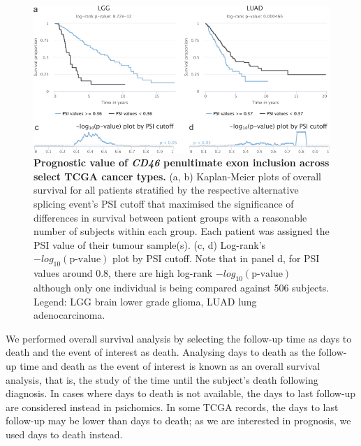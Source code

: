\begin{figure}[!h]
  \includegraphics[width=.8\textwidth]{images/psichomics/11-cd46-as-prognosis}
  \centering
  \caption[Prognostic value of \emph{CD46} penultimate exon inclusion across select TCGA cancer types]{\textbf{Prognostic value of \emph{CD46} penultimate exon inclusion across select TCGA cancer types.} (a, b) Kaplan-Meier plots of overall survival for all patients stratified by the respective alternative splicing event’s PSI cutoff that maximised the significance of differences in survival between patient groups with a reasonable number of subjects within each group. Each patient was assigned the PSI value of their tumour sample(s). (c, d) Log-rank’s $-log_{10}(\textrm{p-value})$ plot by PSI cutoff. Note that in panel d, for PSI values around 0.8, there are high log-rank $-log_{10}(\textrm{p-value})$ although only one individual is being compared against 506 subjects. Legend: LGG brain lower grade glioma, LUAD lung adenocarcinoma.}
  \label{fig:psichomics-cd46-as-prognosis}
\end{figure}


We performed overall survival analysis by selecting the follow-up time as days to death and the event of interest as death. Analysing days to death as the follow-up time and death as the event of interest is known as an overall survival analysis, that is, the study of the time until the subject’s death following diagnosis. In cases where days to death is not available, the days to last follow-up are considered instead in psichomics. In some TCGA records, the days to last follow-up may be lower than days to death; as we are interested in prognosis, we used days to death instead.
 

